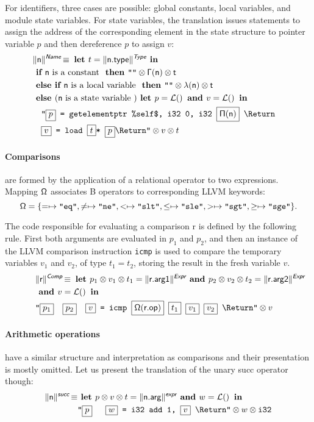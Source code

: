 \documentclass{llncs}
\newcommand{\trad}[2]{\ensuremath{\lVert \textsf{#1} \rVert^{\textit{#2}}}}
\newcommand{\nl}[0]{\text{\Return}}
\DeclareMathOperator{\isdef}{\equiv}
\DeclareMathOperator{\name}{\mathcal{L}()}
\newcommand{\llvm}[1]{\texttt{#1}}
\newcommand{\B}[1]{\textsf{#1}}
\newcommand{\IF}[0]{\textbf{ if }}
\newcommand{\ELSIF}[0]{\textbf{ else if }}
\newcommand{\ELSE}[0]{\textbf{ else }}
\newcommand{\THEN}[0]{\textbf{ then }}
\newcommand{\LET}[0]{\textbf{ let }}
\newcommand{\IN}[0]{\textbf{ in }}
\newcommand{\AND}[0]{\textbf{ and }}
\newcommand{\PH}[1]{\framebox{$#1$}}
\newcommand{\sep}[0]{\otimes}
\newcommand{\Global}[0]{\ensuremath{\sf\Gamma}}
\newcommand{\local}[0]{\ensuremath{\sf\lambda}}
\newcommand{\opmap}[0]{\ensuremath{\sf\Omega}}
\newcommand{\idx}[0]{\ensuremath{\sf\Pi}}
\begin{document}
For identifiers, three cases are possible: global constants, local variables,
and module state variables. For state variables, the translation issues
statements to assign the address of the corresponding element in the state
structure to pointer variable $p$ and then dereference $p$ to assign $v$:
\begin{align*}
\lefteqn{\trad{n}{\B{Name}} \isdef \LET t = \trad{n.type}{\B{Type}} \IN} \\
& \IF \B{n} \mbox{ is a constant } \THEN \llvm{""} \sep \Global(\B{n}) \sep t \\
& \ELSIF \B{n} \mbox{ is a local variable } \THEN 
\llvm{""} \sep \local(\B{n}) \sep t \\
& \ELSE (\B{n} \mbox{ is a state variable }) \LET p = \name \AND v = \name \IN \\
& \quad \llvm{"\PH{p} = getelementptr \%self\$, i32 0, i32 \PH{\idx(\B{n})} \nl} \\
& \quad \llvm{\PH{v} = load \PH{t}* \PH{p}\nl"} \sep v \sep t
\end{align*}

\paragraph{Comparisons} are formed by the application of a relational operator
to two expressions. Mapping $\opmap$ associates B operators to corresponding
LLVM keywords:
$$\opmap = \{ = \mapsto \llvm{"eq"}, 
  \ne \mapsto \llvm{"ne"}, 
  < \mapsto \llvm{"slt"}, 
  \le \mapsto \llvm{"sle"}, 
  > \mapsto \llvm{"sgt"}, 
  \ge \mapsto \llvm{"sge"} \}.
$$

The code responsible for evaluating a comparison \B{r} is defined by the
following rule. First both arguments are evaluated in $p_1$ and $p_2$, and then
an instance of the LLVM comparison instruction \llvm{icmp} is used to compare
the temporary variables $v_1$ and $v_2$, of type $t_1 = t_2$, storing the result
in the fresh variable $v$.
\begin{align*}
\lefteqn{\trad{r}{\B{Comp}} \isdef
  \LET
  p_1 \sep v_1 \sep t_1 = \trad{r.arg1}{\B{Expr}} \AND
  p_2 \sep v_2 \sep t_2 = \trad{r.arg2}{\B{Expr}}} \\
& \AND v = \name \IN \\
& \llvm{"\PH{p_1}\quad\PH{p_2}\quad\PH{v} = icmp \PH{\opmap(\B{r.op})} \PH{t_1} \PH{v_1} \PH{v_2} \nl"} \sep v
\end{align*}
   
\paragraph{Arithmetic operations} have a similar structure and interpretation
as comparisons and their presentation is mostly omitted. Let us present the
translation of the unary \B{succ} operator though:
\begin{align*}
  \trad{n}{\B{succ}} \isdef & \textbf{ let } p \sep v \sep t =
  \trad{n.arg}{\B{expr}} \AND w = \name \IN \\
  & \llvm{"\PH{p} \quad \PH{w} = i32 add 1, \PH{v} \nl"} \sep w \sep \llvm{i32}
\end{align*}
\end{document}
